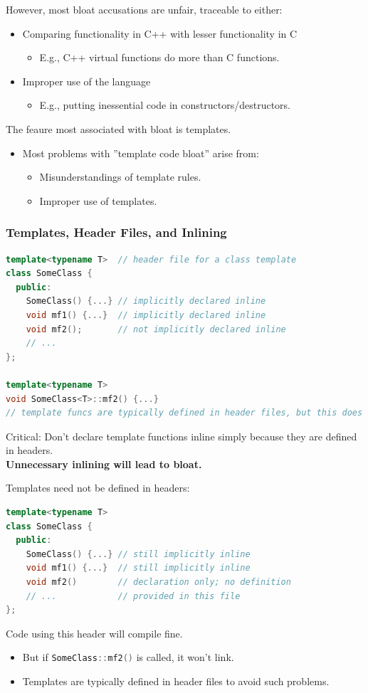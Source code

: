 However, most bloat accusations are unfair, traceable to either:
\begin{itemize}
  \item Comparing functionality in C++ with lesser functionality in C
  \begin{itemize}
    \item E.g., C++ virtual functions do more than C functions.
  \end{itemize}
  \item Improper use of the language
  \begin{itemize}
    \item E.g., putting inessential code in constructors/destructors.
  \end{itemize}
\end{itemize}
The feaure most associated with bloat is templates.
\begin{itemize}
  \item Most problems with ''template code bloat'' arise from:
  \begin{itemize}
    \item Misunderstandings of template rules.
    \item Improper use of templates.
  \end{itemize}
\end{itemize}

\subsubsection{Templates, Header Files, and Inlining}
\begin{lstlisting}[language=C++]
template<typename T>  // header file for a class template
class SomeClass {
  public:
    SomeClass() {...} // implicitly declared inline
    void mf1() {...}  // implicitly declared inline
    void mf2();       // not implicitly declared inline
    // ...
};

template<typename T>
void SomeClass<T>::mf2() {...}
// template funcs are typically defined in header files, but this does not automatically declare them inline
\end{lstlisting}
Critical: Don't declare template functions inline simply because they are defined in headers.\\
\textbf{Unnecessary inlining will lead to bloat.}\\

\pagebreak %

Templates need not be defined in headers:
\begin{lstlisting}[language=C++]
template<typename T>
class SomeClass {
  public:
    SomeClass() {...} // still implicitly inline
    void mf1() {...}  // still implicitly inline
    void mf2()        // declaration only; no definition
    // ...            // provided in this file
};
\end{lstlisting}
Code using this header will compile fine.
\begin{itemize}
  \item But if \lstinline[language=C++]{SomeClass::mf2()} is called, it won't link.
  \item Templates are typically defined in header files to avoid such problems.
\end{itemize}

